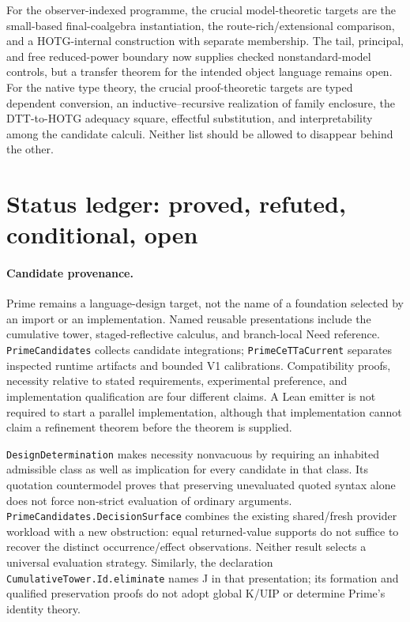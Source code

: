 \documentclass[11pt]{article}
\theoremstyle{definition}
\theoremstyle{remark}
\begin{document}
For the observer-indexed programme, the crucial model-theoretic targets are the
small-based final-coalgebra instantiation, the route-rich/extensional comparison,
and a HOTG-internal construction with separate membership.  The tail,
principal, and free reduced-power boundary now supplies checked nonstandard-model
controls, but a transfer theorem for the intended object language remains open.
For the native type theory, the crucial proof-theoretic targets are typed
dependent conversion, an inductive--recursive realization of family enclosure,
the DTT-to-HOTG adequacy square, effectful substitution, and interpretability
among the candidate calculi.  Neither list should be allowed to disappear behind
the other.

\section{Status ledger: proved, refuted, conditional, open}
\label{sec:status-ledger}

\paragraph{Candidate provenance.}
Prime remains a language-design target, not the name of a foundation selected
by an import or an implementation. Named reusable presentations include the
cumulative tower, staged-reflective calculus, and branch-local Need reference.
\texttt{PrimeCandidates} collects candidate integrations;
\texttt{PrimeCeTTaCurrent} separates inspected runtime artifacts and bounded
V1 calibrations. Compatibility proofs, necessity relative to stated
requirements, experimental preference, and implementation qualification are
four different claims. A Lean emitter is not required to start a parallel
implementation, although that implementation cannot claim a refinement theorem
before the theorem is supplied.

\texttt{DesignDetermination} makes necessity nonvacuous by requiring an
inhabited admissible class as well as implication for every candidate in that
class. Its quotation countermodel proves that preserving unevaluated quoted
syntax alone does not force non-strict evaluation of ordinary arguments.
\texttt{PrimeCandidates.DecisionSurface} combines the existing shared/fresh
provider workload with a new obstruction: equal returned-value supports do
not suffice to recover the distinct occurrence/effect observations. Neither
result selects a universal evaluation strategy. Similarly, the declaration
\texttt{CumulativeTower.Id.eliminate} names J in that presentation; its
formation and qualified preservation proofs do not adopt global K/UIP or
determine Prime's identity theory.
\end{document}
